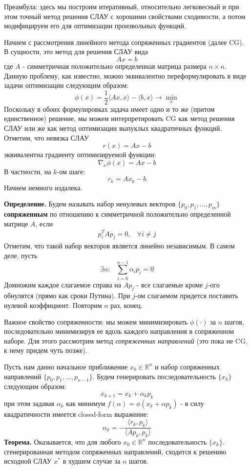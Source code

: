 Преамбула: здесь мы построим итеративный, относительно легковесный и при этом точный метод решения СЛАУ с хорошими свойствами сходимости, а потом модифицируем его для оптимизации произвольных функций.

    Начнем с рассмотрения линейного метода сопряженных градиентов (далее CG). В сущности, это метод для решения СЛАУ вида $$Ax = b$$ где $A$ - симметричная положительно определенная матрица размера $n \times n$. Данную проблему, как известно, можно эквивалентно переформулировать в виде задачи оптимизации следующим образом: $$ \phi(x) = \frac{1}{2}\langle Ax, x\rangle - \langle b, x \rangle \to \min\limits_x$$
    Поскольку в обоих формулировках задача имеет одно и то же (притом единственное) решение, мы можем интерпретировать CG как метод решения СЛАУ или же как метод оптимизации выпуклых квадратичных функций. Отметим, что невязка СЛАУ $$r(x) = Ax-b$$ эквивалентна градиенту оптимизируемой функции: $$\nabla_x \phi(x) = Ax - b$$ В частности, на $k$-ом шаге: $$r_k = Ax_k - b$$Начнем немного издалека.

   \textbf{Определение.} Будем называть набор ненулевых векторов $\{ p_0, p_1,..., p_m\}$  \textbf{сопряженным} по отношению к симметричной положительно определенной матрице $A$, если
    \begin{align}
    p_i^T A p_j = 0, \ \ \ \  \forall i \neq j
    \end{align}
    Отметим, что такой набор векторов является линейно независимым. В самом деле, пусть $$\exists \alpha: \ \ \ \sum\limits_{i=0}^{n-1} \alpha_i p_i = 0$$
    Домножим каждое слагаемое справа на $Ap_j$ - все слагаемые кроме $j$-ого обнулятся (прямо как сроки Путина). При $j$-ом слагаемом придется поставить нулевой коэффициент. Повторим $n$ раз, конец.

    Важное свойство сопряженности: мы можем минимизировать $\phi(\cdot)$  за $n$ шагов, последовательно минимизируя ее вдоль каждого направления в сопряженном наборе. Для этого рассмотрим метод \textit{сопряженных направлений} (это пока не CG, к нему придем чуть позже).

    Пусть нам данно начальное приближение $x_0 \in \mathbb{R}^n$  и набор сопряженных направлений $\{p_0, p_1,..., p_{n-1}\}$. Будем генерировать последовательность $\{x_k\}$ следующим образом: $$x_{k+1} = x_k + \alpha_k p_k$$при этом задавая $\alpha_k$  как минимум $f(\alpha) = \phi(x_k + \alpha p_k)$ - в силу квадратичности имеется closed-form выражение: $$\alpha_k = -\frac{\langle r_k, p_k \rangle}{\langle Ap_k, p_k \rangle} $$
   	 \textbf{Теорема.} Оказывается, что для любого $x_0 \in \mathbb{R}^n$ последовательность $\{ x_k\}$. сгенерированная методом сопряженных направлений, сходится к решению исходной СЛАУ $x^*$ в худшем случае за $n$ шагов.

